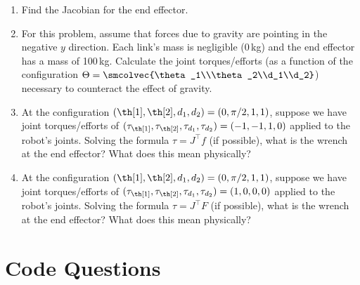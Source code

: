 \documentclass{16384_doc}
\begin{document}
\begin{questions}
\begin{enumerate} [label=\alph*.]
        \item \text{[5 points]} Find the Jacobian for the end effector.
        \begin{tcolorbox}[height=5cm]
        \end{tcolorbox}

        \item \text{[5 points]} For this problem, assume that forces due to gravity are pointing in the negative $y$ direction. Each link's mass is negligible (0\,kg) and the end effector has a mass of 100\,kg. Calculate the joint torques/efforts (as a function of the configuration $\Theta=\smcolvec{\theta_1\\\theta_2\\d_1\\d_2}$) necessary to counteract the effect of gravity.
        \begin{tcolorbox}[height=3cm]
        \end{tcolorbox}

        \item \text{[5 points]} At the configuration $(\th[1], \th[2], d_1, d_2) = (0, \pi/2, 1, 1)$, suppose we have joint torques/efforts of $(\tau_{\th[1]}, \tau_{\th[2]}, \tau_{d_1}, \tau_{d_2})=(-1,-1,1,0)$ applied to the robot's joints. Solving the formula $\tau = J^\top f$ (if possible), what is the wrench at the end effector?  What does this mean physically?
        \begin{tcolorbox}[height=3cm]
        \end{tcolorbox}

        \item \text{[5 points]} At the configuration $(\th[1], \th[2], d_1, d_2) = (0, \pi/2, 1, 1)$, suppose we have joint torques/efforts of $(\tau_{\th[1]}, \tau_{\th[2]}, \tau_{d_1}, \tau_{d_2})=(1,0,0,0)$ applied to the robot's joints. Solving the formula $\tau = J^\top F$ (if possible), what is the wrench at the end effector?  What does this mean physically?
        \begin{tcolorbox}[height=3cm]
        \end{tcolorbox}
    \end{enumerate}
\end{questions}

\section{Code Questions}
\end{document}
